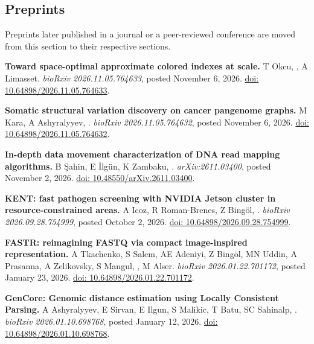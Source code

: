 \clearpage

\vspace{-.4cm}
\subsection{\small \sc  Preprints}
 \vspace{-0.6cm}

\small{
Preprints later published in a journal or a peer-reviewed conference are moved from this section to their respective sections.
}

\vspace{-.2cm}
    {\bf Toward space-optimal approximate colored indexes at scale.} T Okcu, \calkan{}, A Limasset.
     {\it bioRxiv 2026.11.05.764633}, posted November 6, 2026.
    \href{https://doi.org/10.64898/2026.11.05.764633}{doi: 10.64898/2026.11.05.764633}.

\vspace{-.2cm}
    {\bf Somatic structural variation discovery on cancer pangenome graphs.} M Kara, A Ashyralyyev, \calkan{}.
     {\it bioRxiv 2026.11.05.764632}, posted November 6, 2026.
    \href{https://doi.org/10.64898/2026.11.05.764632}{doi: 10.64898/2026.11.05.764632}.

\vspace{-.2cm}
    {\bf In-depth data movement characterization of DNA read mapping algorithms.} B Şahin, E İlgün, K Zambaku, \calkan{}.
    {\it arXiv:2611.03400}, posted November 2, 2026. \href{https://doi.org/10.48550/arXiv.2611.03400}{doi: 10.48550/arXiv.2611.03400}.

\vspace{-.2cm}
    {\bf KENT: fast pathogen screening with NVIDIA Jetson cluster in resource-constrained areas.} A Icoz, R Roman-Brenes, Z Bingöl, \calkan{}.
     {\it bioRxiv 2026.09.28.754999}, posted October 2, 2026.
    \href{https://doi.org/10.64898/2026.09.28.754999}{doi: 10.64898/2026.09.28.754999}.
    
\vspace{-.2cm}
    {\bf FASTR: reimagining FASTQ via compact image-inspired representation.} A Tkachenko, S Salem, AE Adeniyi, Z Bingöl, MN Uddin, A Prasanna, A Zelikovsky, S Mangul, \calkan{}, M Alser. {\it bioRxiv 2026.01.22.701172}, posted January 23, 2026.
    \href{https://doi.org/10.64898/2026.01.22.701172}{doi: 10.64898/2026.01.22.701172}.

\vspace{-.2cm}
    {\bf GenCore: Genomic distance estimation using Locally Consistent Parsing.} A Ashyralyyev, E Sirvan, E Ilgun, S Malikic, T Batu, SC Sahinalp,  \calkan{}. {\it bioRxiv 2026.01.10.698768}, posted January 12, 2026.
    \href{https://doi.org/10.64898/2026.01.10.698768}{doi: 10.64898/2026.01.10.698768}.
    
